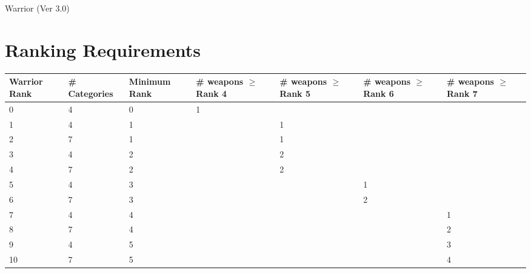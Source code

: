 \begin{Chapter}{Warrior (Ver 3.0)}
\begin{table*}
\end{table*}

\begin{table*}
\section{Ranking Requirements}

\medskip

\begin{tabular}{|l|l|l|l|l|l|l|} \hline
Warrior Rank & \# Categories & Minimum Rank & \# weapons $\geq$ Rank 4 & \# weapons $\geq$ Rank 5 & \# weapons $\geq$ Rank 6 & \# weapons $\geq$ Rank 7 \\ \hline
0	& 4	& 0	& 1	& 	& 	& \\ \hline
1	& 4	& 1	& 	& 1	& 	& \\ \hline
2	& 7	& 1	& 	& 1	& 	& \\ \hline
3	& 4	& 2	& 	& 2	& 	& \\ \hline
4	& 7	& 2	& 	& 2	& 	& \\ \hline
5	& 4	& 3	& 	& 	& 1	& \\ \hline
6	& 7	& 3	& 	& 	& 2	& \\ \hline
7	& 4	& 4	& 	& 	& 	& 1 \\ \hline
8	& 7	& 4	& 	& 	& 	& 2 \\ \hline
9	& 4	& 5	& 	& 	& 	& 3 \\ \hline
10	& 7	& 5	& 	& 	& 	& 4 \\ \hline
\end{tabular}
\end{table*}

\end{Chapter}
